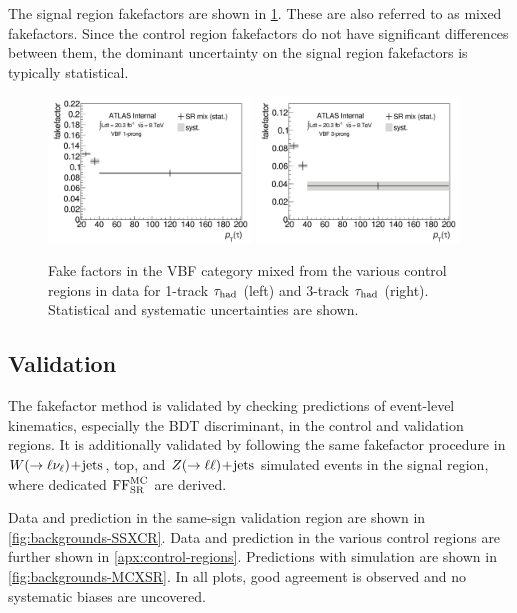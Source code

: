 The signal region fakefactors are shown in \cref{fig:backgrounds-fakefactorsVBFmix}. These are also referred to as mixed fakefactors. Since the control region fakefactors do not have significant differences between them, the dominant uncertainty on the signal region fakefactors is typically statistical.

\begin{figure}[tp]
  \centering
  \includegraphics[width=0.48\textwidth]{figures/backgrounds/fakefactor_8TeV_vbf_1p_mix}
  \includegraphics[width=0.48\textwidth]{figures/backgrounds/fakefactor_8TeV_vbf_3p_mix}
  \caption{Fake factors in the VBF category mixed from the various control regions in data for 1-track $\tau_\text{had}$ (left) and 3-track $\tau_\text{had}$ (right). Statistical and systematic uncertainties are shown.}
  \label{fig:backgrounds-fakefactorsVBFmix}
\end{figure}

\subsection{Validation}

The fakefactor method is validated by checking predictions of event-level kinematics, especially the BDT discriminant, in the control and validation regions. It is additionally validated by following the same fakefactor procedure in $W (\rightarrow \ell\nu_\ell)\!+\!\text{jets}$, top, and $Z (\rightarrow \ell\ell)\!+\!\text{jets}$ simulated events in the signal region, where dedicated $\text{FF}_\text{SR}^\text{MC}$ are derived.

Data and prediction in the same-sign validation region are shown in \cref{fig:backgrounds-SSXCR}. Data and prediction in the various control regions are further shown in \cref{apx:control-regions}. Predictions with simulation are shown in \cref{fig:backgrounds-MCXSR}. In all plots, good agreement is observed and no systematic biases are uncovered.

